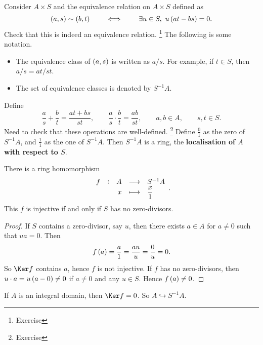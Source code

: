 \begin{definition}
Consider $ A \times S $ and the equivalence relation on $ A \times S $ defined as
$$ \br{a, s} \sim \br{b, t} \qquad \iff \qquad \exists u \in S, \ u\br{at - bs} = 0. $$
Check that this is indeed an equivalence relation. \footnote{Exercise} The following is some notation.
\begin{itemize}
\item The equivalence class of $ \br{a, s} $ is written as $ a / s $. For example, if $ t \in S $, then $ a / s = at / st $.
\item The set of equivalence classes is denoted by $ S^{-1}A $.
\end{itemize}
Define
$$ \dfrac{a}{s} + \dfrac{b}{t} = \dfrac{at + bs}{st}, \qquad \dfrac{a}{s} \cdot \dfrac{b}{t} = \dfrac{ab}{st}, \qquad a, b \in A, \qquad s, t \in S. $$
Need to check that these operations are well-defined. \footnote{Exercise} Define $ \tfrac{0}{1} $ as the zero of $ S^{-1}A $, and $ \tfrac{1}{1} $ as the one of $ S^{-1}A $. Then $ S^{-1}A $ is a ring, the \textbf{localisation of $ A $ with respect to $ S $}.
\end{definition}

\begin{lemma}
There is a ring homomorphism
$$ \function[f]{A}{S^{-1}A}{x}{\dfrac{x}{1}}. $$
This $ f $ is injective if and only if $ S $ has no zero-divisors.
\end{lemma}

\begin{proof}
If $ S $ contains a zero-divisor, say $ u $, then there exists $ a \in A $ for $ a \ne 0 $ such that $ ua = 0 $. Then
$$ f\br{a} = \dfrac{a}{1} = \dfrac{au}{u} = \dfrac{0}{u} = 0. $$
So $ \Ker f $ contains $ a $, hence $ f $ is not injective. If $ f $ has no zero-divisors, then $ u \cdot a = u\br{a - 0} \ne 0 $ if $ a \ne 0 $ and any $ u \in S $. Hence $ f\br{a} \ne 0 $.
\end{proof}


If $ A $ is an integral domain, then $ \Ker f = 0 $. So $ A \hookrightarrow S^{-1}A $.

\pagebreak

